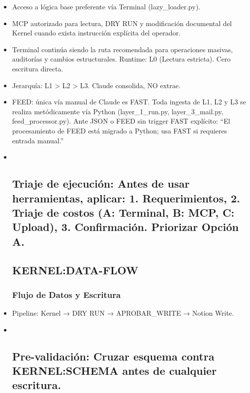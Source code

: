 \documentclass[
]{article}
\begin{document}
\begin{itemize}
\item
  Acceso a lógica base preferente vía Terminal (lazy\_loader.py).
\item
  MCP autorizado para lectura, DRY RUN y modificación documental del
  Kernel cuando exista instrucción explícita del operador.
\item
  Terminal continúa siendo la ruta recomendada para operaciones masivas,
  auditorías y cambios estructurales. Runtime: L0 (Lectura estricta).
  Cero escritura directa.
\item
  Jerarquía: L1 \textgreater{} L2 \textgreater{} L3. Claude consolida,
  NO extrae.
\item
  FEED: única vía manual de Claude es FAST. Toda ingesta de L1, L2 y L3
  se realiza metódicamente vía Python (layer\_1\_run.py,
  layer\_3\_mail.py, feed\_processor.py). Ante JSON o FEED sin trigger
  FAST explícito: ``El procesamiento de FEED está migrado a Python; usa
  FAST si requieres entrada manual.''
\item ~
  \subsection{Triaje de ejecución: Antes de usar herramientas, aplicar:
  1. Requerimientos, 2. Triaje de costos (A: Terminal, B: MCP, C:
  Upload), 3. Confirmación. Priorizar Opción
  A.}\label{triaje-de-ejecuciuxf3n-antes-de-usar-herramientas-aplicar-1.-requerimientos-2.-triaje-de-costos-a-terminal-b-mcp-c-upload-3.-confirmaciuxf3n.-priorizar-opciuxf3n-a.}

  \subsection{KERNEL:DATA-FLOW}\label{kerneldata-flow}

  \subsubsection{Flujo de Datos y
  Escritura}\label{flujo-de-datos-y-escritura}
\item
  Pipeline: Kernel → DRY RUN → APROBAR\_WRITE → Notion Write.
\item ~
  \subsection{Pre-validación: Cruzar esquema contra KERNEL:SCHEMA antes
  de cualquier
  escritura.}\label{pre-validaciuxf3n-cruzar-esquema-contra-kernelschema-antes-de-cualquier-escritura.}


\end{itemize}
\end{document}
